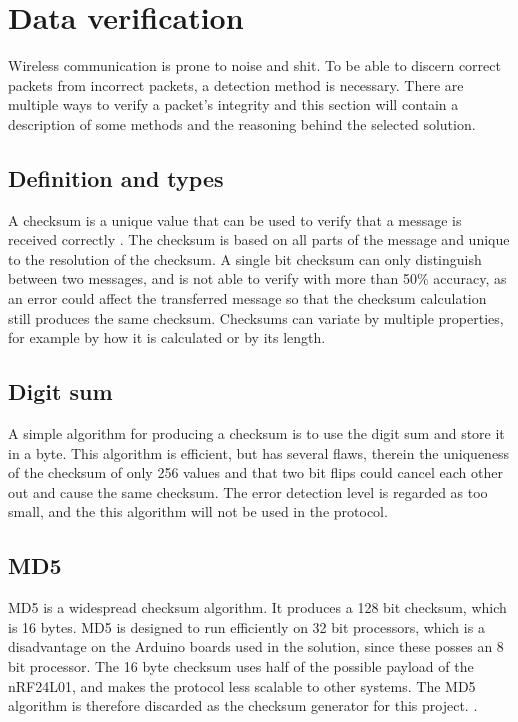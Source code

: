 \section{Data verification}
Wireless communication is prone to noise and shit\cite{source}. To be able to discern correct packets from incorrect packets, a detection method is necessary. There are multiple ways to verify a packet's integrity and this section will contain a description of some methods and the reasoning behind the selected solution.

\subsection{Definition and types}
A checksum is a unique value that can be used to verify that a message is received correctly \cite{datapakke}. The checksum is based on all parts of the message and unique to the resolution of the checksum. 
A single bit checksum can only distinguish between two messages, and is not able to verify with more than 50\% accuracy, as an error could affect the transferred message so that the checksum calculation still produces the same checksum. Checksums can variate by multiple properties, for example by how it is calculated or by its length. 

\subsection*{Digit sum} 
A simple algorithm for producing a checksum is to use the digit sum and store it in a byte. This algorithm is efficient, but has several flaws, therein the uniqueness of the checksum of only 256 values and that two bit flips could cancel each other out and cause the same checksum. The error detection level is regarded as too small, and the this algorithm will not be used in the protocol.

\subsection*{MD5}
MD5 is a widespread checksum algorithm. It produces a 128 bit checksum, which is 16 bytes. MD5 is designed to run efficiently on 32 bit processors, which is a disadvantage on the Arduino boards used in the solution, since these posses an 8 bit processor. The 16 byte checksum uses half of the possible payload of the nRF24L01, and makes the protocol less scalable to other systems.  The MD5 algorithm is therefore discarded as the checksum generator for this project. \cite[p.~308]{boyles2010ccna}.

